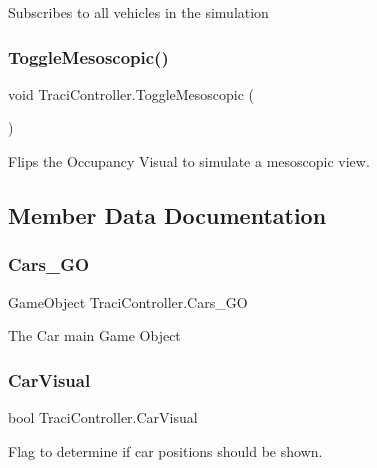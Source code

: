 Subscribes to all vehicles in the simulation 

\mbox{\label{class_traci_controller_a14b200d6e8bf71d6ae2391801b6eb51a}} 
\subsubsection{\texorpdfstring{ToggleMesoscopic()}{ToggleMesoscopic()}}
{\footnotesize\ttfamily void Traci\+Controller.\+Toggle\+Mesoscopic (\begin{DoxyParamCaption}{ }\end{DoxyParamCaption})}



Flips the Occupancy Visual to simulate a mesoscopic view. 



\subsection{Member Data Documentation}
\mbox{\label{class_traci_controller_a29b2da0a754eabda5002fad9b07213c6}} 
\subsubsection{\texorpdfstring{Cars\_GO}{Cars\_GO}}
{\footnotesize\ttfamily Game\+Object Traci\+Controller.\+Cars\+\_\+\+GO}



The Car main Game Object 

\mbox{\label{class_traci_controller_a0e5d2ec61d361d163647ed1eac5cbeca}} 
\subsubsection{\texorpdfstring{CarVisual}{CarVisual}}
{\footnotesize\ttfamily bool Traci\+Controller.\+Car\+Visual}



Flag to determine if car positions should be shown. 

